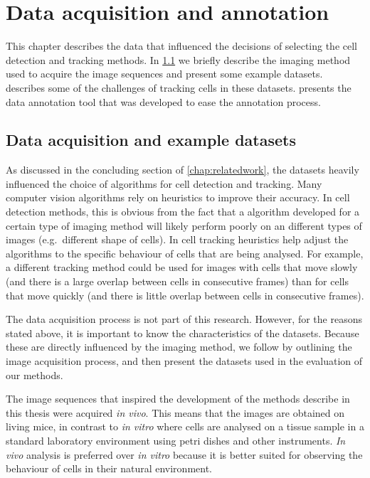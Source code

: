 \chapter{Data acquisition and annotation \statusfirstdraft}
	\label{chap:data}
	
	This chapter describes the data that influenced the decisions of selecting the cell detection and tracking methods. In \cref{sec:data_examples} we briefly describe the imaging method used to acquire the image sequences and present some example datasets.  describes some of the challenges of tracking cells in these datasets.  presents the data annotation tool that was developed to ease the annotation process.

    \section{Data acquisition and example datasets \statusseconddraft}
    \label{sec:data_examples}
    
    As discussed in the concluding section of \cref{chap:relatedwork}, the datasets heavily influenced the choice of algorithms for cell detection and tracking. Many computer vision algorithms rely on heuristics to improve their accuracy. In cell detection methods, this is obvious from the fact that a algorithm developed for a certain type of imaging method will likely perform poorly on an different types of images (e.g.\ different shape of cells). In cell tracking heuristics help adjust the algorithms to the specific behaviour of cells that are being analysed. For example, a different tracking method could be used for images with cells that move slowly (and there is a large overlap between cells in consecutive frames) than for cells that move quickly (and there is little overlap between cells in consecutive frames).
    
    The data acquisition process is not part of this research. However, for the reasons stated above, it is important to know the characteristics of the datasets. Because these are directly influenced by the imaging method, we follow by outlining the image acquisition process, and then present the datasets used in the evaluation of our methods.
    
    The image sequences that inspired the development of the methods describe in this thesis were acquired \textit{in vivo}. This means that the images are obtained on living mice, in contrast to \textit{in vitro} where cells are analysed on a tissue sample in a standard laboratory environment using petri dishes and other instruments. \textit{In vivo} analysis is preferred over \textit{in vitro} because it is better suited for observing the behaviour of cells in their natural environment.
    
